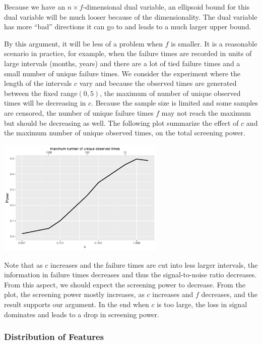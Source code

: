Because we have an $n\times f$-dimensional dual variable, an ellipsoid bound for this dual variable will be much looser because of the dimensionality. The dual variable has more ``bad'' directions it can go to and leads to a much larger upper bound.

By this argument, it will be less of a problem when $f$ is smaller. It is a reasonable scenario in practice, for example, when the failure times are recorded in units of large intervals (months, years) and there are a lot of tied failure times and a small number of unique failure times. We consider the experiment where the length of the intervals $c$ vary and because the observed times are generated between the fixed range$(0,5)$, the maximum of number of unique observed times will be decreasing in $c$. Because the sample size is limited and some samples are censored, the number of unique failure times $f$ may not reach the maximum but should be decreasing as well. The following plot summarize the effect of $c$ and the maximum number of unique observed times, on the total screening power.

\begin{center}
    \includegraphics[width=0.6\textwidth]{interval.pdf}
\end{center}

Note that as $c$ increases and the failure times are cut into less larger intervals, the information in failure times decreases and thus the signal-to-noise ratio decreases. From this aspect, we should expect the screening power to decrease. From the plot, the screening power mostly increases, as $c$ increases and $f$ decreases, and the result supports our argument. In the end when $c$ is too large, the loss in signal dominates and leads to a drop in screening power.

\subsubsection{Distribution of Features}

